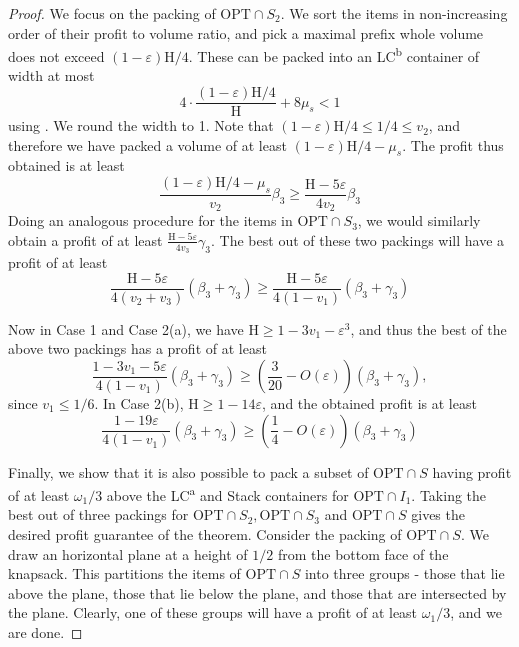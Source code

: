 \documentclass[10pt,a4paper]{amsart}
\renewcommand{\epsilon}{\varepsilon} %
\theoremstyle{definition}
\newcommand{\HH}{\mathrm{H}}
\begin{document}
\begin{proof}
    We focus on the packing of $\text{OPT}\cap S_2$. We sort the items in non-increasing order of their profit to volume ratio, and pick a maximal prefix whole volume does not exceed $(1-\epsilon)\HH/4$. These can be packed into an LC\textsuperscript{b} container of width at most
    \[4\cdot \frac{(1-\epsilon)\HH/4}{\HH}+8\mu_s <1\]
    using . We round the width to 1. Note that $(1-\epsilon)\HH/4 \le 1/4\le v_2$, and therefore we have packed a volume of at least $(1-\epsilon)\HH/4 - \mu_s$. The profit thus obtained is at least 
    \[ \frac{(1-\epsilon)\HH/4 - \mu_s}{v_2}\beta_3 \ge \frac{\HH-5\epsilon}{4v_2}\beta_3\]
    Doing an analogous procedure for the items in $\text{OPT}\cap S_3$, we would similarly obtain a profit of at least $\frac{\HH-5\epsilon}{4v_3}\gamma_3$. The best out of these two packings will have a profit of at least 
    \[ \frac{\HH -5\epsilon}{4(v_2+v_3)}(\beta_3+\gamma_3) \ge \frac{\HH-5\epsilon}{4(1-v_1)}(\beta_3+\gamma_3)\]

    Now in Case 1 and Case 2(a), we have $\HH \ge 1-3v_1-\epsilon^3$, and thus the best of the above two packings has a profit of at least
    \[ \frac{1-3v_1-5\epsilon}{4(1-v_1)}(\beta_3+\gamma_3) \ge \left(\frac{3}{20}-O(\epsilon)\right)(\beta_3+\gamma_3),\]
    since $v_1\le 1/6$. In Case 2(b), $\HH \ge 1-14\epsilon$, and the obtained profit is at least 
    \[ \frac{1-19\epsilon}{4(1-v_1)}(\beta_3+\gamma_3) \ge \left(\frac{1}{4}-O(\epsilon)\right)(\beta_3+\gamma_3)\]

    Finally, we show that it is also possible to pack a subset of $\text{OPT}\cap S$ having profit of at least $\omega_1/3$ above the LC\textsuperscript{a} and Stack containers for $\text{OPT}\cap I_1$. Taking the best out of three packings for $\text{OPT}\cap S_2, \text{OPT}\cap S_3$ and $\text{OPT}\cap S$ gives the desired profit guarantee of the theorem.  Consider the packing of $\text{OPT}\cap S$. We draw an horizontal plane at a height of $1/2$ from the bottom face of the knapsack. This partitions the items of $\text{OPT}\cap S$ into three groups - those that lie above the plane, those that lie below the plane, and those that are intersected by the plane. Clearly, one of these groups will have a profit of at least $\omega_1/3$, and we are done.
    
    
\end{proof}
\fi
\end{document}
